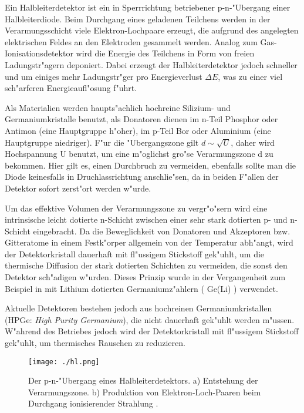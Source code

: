 \documentclass[12pt]{article}
\begin{document}
Ein Halbleiterdetektor ist ein in Sperrrichtung betriebener p-n-"Ubergang einer Halbleiterdiode. Beim Durchgang eines geladenen Teilchens werden in der Verarmungsschicht viele Elektron-Lochpaare erzeugt, die aufgrund des angelegten elektrischen Feldes an den Elektroden gesammelt werden. Analog zum Gas-Ionisationsdetektor wird die Energie des Teilchens in Form von freien Ladungstr"agern deponiert. Dabei 
erzeugt der Halbleiterdetektor jedoch schneller und um einiges mehr Ladungstr"ger pro Energieverlust $\Delta E$, was zu einer viel sch"arferen Energieaufl"osung f"uhrt. \par 
Als Materialien werden haupts"achlich hochreine Silizium- und Germaniumkristalle benutzt, als Donatoren dienen im n-Teil Phosphor oder Antimon (eine Hauptgruppe h"oher), im p-Teil Bor oder Aluminium (eine Hauptgruppe niedriger). F"ur die "Ubergangszone gilt $d\sim\sqrt{U}$, daher wird Hochspannung U benutzt, um eine m"oglichst gro"se Verarmungszone d zu bekommen. Hier gilt es, einen Durchbruch zu vermeiden, ebenfalls sollte man die Diode keinesfalls in Druchlassrichtung anschlie"sen, da in beiden F"allen der Detektor sofort zerst"ort werden w"urde. \par 
Um das effektive Volumen der Verarmungszone zu vergr"o"sern wird eine intrinsische leicht dotierte n-Schicht zwischen einer sehr stark dotierten p- und n-Schicht eingebracht. Da die Beweglichkeit von Donatoren und Akzeptoren bzw. Gitteratome in einem Festk"orper allgemein von der Temperatur abh"angt, wird der Detektorkristall dauerhaft mit fl"ussigem Stickstoff gek"uhlt, um die thermische Diffusion der stark dotierten Schichten zu vermeiden, die sonst den Detektor sch"adigen w"urden. Dieses Prinzip wurde in der Vergangenheit zum Beispiel in mit Lithium dotierten Germaniumz"ahlern ( Ge(Li) ) verwendet. \par 
Aktuelle Detektoren bestehen jedoch aus hochreinen Germaniumkristallen (HPGe: \textit{High Purity Germanium}), die nicht dauerhaft gek"uhlt werden m"ussen. W"ahrend des Betriebes jedoch wird der Detektorkristall mit fl"ussigem Stickstoff gek"uhlt, um thermisches Rauschen zu reduzieren.     
\begin{figure}
	\centering
	\texttt{[image: ./hl.png]}
	\caption[Halbleiterdetektor]{Der p-n-"Ubergang eines Halbleiterdetektors. a) Entstehung der Verarmungszone. b) Produktion von Elektron-Loch-Paaren beim Durchgang ionisierender Strahlung \cite{demtroeder}.}   
	\label{fig:hl}
\end{figure}
\vfill
\clearpage
\end{document}

